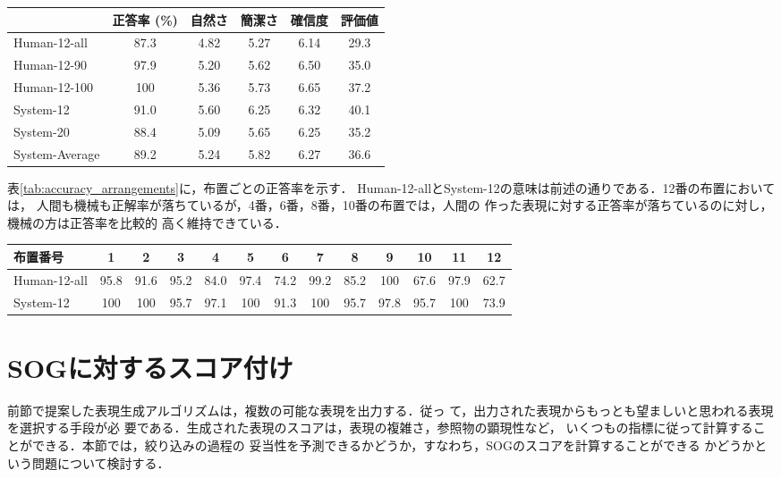 \documentclass{nlp}
\begin{document}
\begin{table*}[tb]
  \centering
  \caption{生成表現の評価}\vspace{2mm}
  \begin{tabular}{l|ccccc}
    \hline
    & 正答率 (\%)& 自然さ & 簡潔さ & 確信度 & 評価値\\
    \hline
    Human-12-all  & 87.3  & 4.82  & 5.27  & 6.14 & 29.3 \\
    Human-12-90   & 97.9  & 5.20  & 5.62  & 6.50 & 35.0 \\
    Human-12-100  & 100   & 5.36  & 5.73  & 6.65 & 37.2 \\
    \hline
    System-12     & 91.0  & 5.60  & 6.25  & 6.32 & 40.1  \\
    System-20     & 88.4  & 5.09  & 5.65  & 6.25 & 35.2  \\
    System-Average& 89.2  & 5.24  & 5.82  & 6.27 & 36.6  \\
    \hline
  \end{tabular}
  \label{tab:evaluation}
\end{table*}

表\ref{tab:accuracy_arrangements}に，布置ごとの正答率を示す．
Human-12-allとSystem-12の意味は前述の通りである．12番の布置においては，
人間も機械も正解率が落ちているが，4番，6番，8番，10番の布置では，人間の
作った表現に対する正答率が落ちているのに対し，機械の方は正答率を比較的
高く維持できている．

\begin{table*}[tb]
\small
  \centering
  \caption{布置ごとの正答率（\%）}\vspace{2mm}
  \begin{tabular}{l|cccccccccccc}\hline
布置番号     & 1&2&3&4&5&6&7&8&9&10&11&12 \\\hline
Human-12-all & 95.8 & 91.6 & 95.2 & 84.0 & 97.4 & 74.2 & 99.2 & 85.2 & 100 & 67.6 & 97.9 &62.7 \\
System-12    & 100  & 100 & 95.7 & 97.1 & 100 & 91.3 & 100 & 95.7 &
97.8 & 95.7 & 100 & 73.9 \\ \hline
  \end{tabular}
  \label{tab:accuracy_arrangements}
\end{table*}


\section{SOGに対するスコア付け}
\label{sec:scoring}

前節で提案した表現生成アルゴリズムは，複数の可能な表現を出力する．従っ
て，出力された表現からもっとも望ましいと思われる表現を選択する手段が必
要である．生成された表現のスコアは，表現の複雑さ，参照物の顕現性など，
いくつもの指標に従って計算することができる．本節では，絞り込みの過程の
妥当性を予測できるかどうか，すなわち，SOGのスコアを計算することができる
かどうかという問題について検討する．
\end{document}
